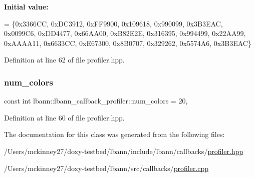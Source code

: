 {\bfseries Initial value\+:}
\begin{DoxyCode}
= \{0x3366CC, 0xDC3912, 0xFF9900, 0x109618, 0x990099, 0x3B3EAC,
                            0x0099C6, 0xDD4477, 0x66AA00, 0xB82E2E, 0x316395, 0x994499,
                            0x22AA99, 0xAAAA11, 0x6633CC, 0xE67300, 0x8B0707, 0x329262,
                            0x5574A6, 0x3B3EAC\}
\end{DoxyCode}


Definition at line 62 of file profiler.\+hpp.

\mbox{\label{classlbann_1_1lbann__callback__profiler_a48e38406712543f839dd7e5e840694e2}} 
\subsubsection{\texorpdfstring{num\+\_\+colors}{num\_colors}}
{\footnotesize\ttfamily const int lbann\+::lbann\+\_\+callback\+\_\+profiler\+::num\+\_\+colors = 20\hspace{0.3cm}{\ttfamily [static]}, {\ttfamily [private]}}



Definition at line 60 of file profiler.\+hpp.



The documentation for this class was generated from the following files\+:\begin{DoxyCompactItemize}
\item 
/\+Users/mckinney27/doxy-\/testbed/lbann/include/lbann/callbacks/\hyperlink{profiler_8hpp}{profiler.\+hpp}\item 
/\+Users/mckinney27/doxy-\/testbed/lbann/src/callbacks/\hyperlink{profiler_8cpp}{profiler.\+cpp}\end{DoxyCompactItemize}
